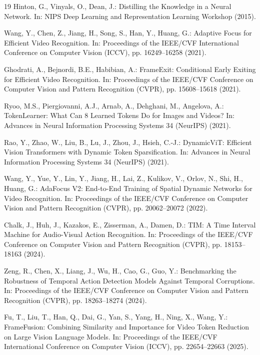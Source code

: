\documentclass[runningheads]{llncs}
\begin{document}
\begin{thebibliography}{19}
Hinton, G., Vinyals, O., Dean, J.:
Distilling the Knowledge in a Neural Network.
In: NIPS Deep Learning and Representation Learning Workshop (2015).

Wang, Y., Chen, Z., Jiang, H., Song, S., Han, Y., Huang, G.:
Adaptive Focus for Efficient Video Recognition.
In: Proceedings of the IEEE/CVF International Conference on Computer Vision (ICCV), pp. 16249--16258 (2021).

Ghodrati, A., Bejnordi, B.E., Habibian, A.:
FrameExit: Conditional Early Exiting for Efficient Video Recognition.
In: Proceedings of the IEEE/CVF Conference on Computer Vision and Pattern Recognition (CVPR), pp. 15608--15618 (2021).

Ryoo, M.S., Piergiovanni, A.J., Arnab, A., Dehghani, M., Angelova, A.:
TokenLearner: What Can 8 Learned Tokens Do for Images and Videos?
In: Advances in Neural Information Processing Systems 34 (NeurIPS) (2021).

Rao, Y., Zhao, W., Liu, B., Lu, J., Zhou, J., Hsieh, C.-J.:
DynamicViT: Efficient Vision Transformers with Dynamic Token Sparsification.
In: Advances in Neural Information Processing Systems 34 (NeurIPS) (2021).

Wang, Y., Yue, Y., Lin, Y., Jiang, H., Lai, Z., Kulikov, V., Orlov, N., Shi, H., Huang, G.:
AdaFocus V2: End-to-End Training of Spatial Dynamic Networks for Video Recognition.
In: Proceedings of the IEEE/CVF Conference on Computer Vision and Pattern Recognition (CVPR), pp. 20062--20072 (2022).

Chalk, J., Huh, J., Kazakos, E., Zisserman, A., Damen, D.:
TIM: A Time Interval Machine for Audio-Visual Action Recognition.
In: Proceedings of the IEEE/CVF Conference on Computer Vision and Pattern Recognition (CVPR), pp. 18153--18163 (2024).

Zeng, R., Chen, X., Liang, J., Wu, H., Cao, G., Guo, Y.:
Benchmarking the Robustness of Temporal Action Detection Models Against Temporal Corruptions.
In: Proceedings of the IEEE/CVF Conference on Computer Vision and Pattern Recognition (CVPR), pp. 18263--18274 (2024).

Fu, T., Liu, T., Han, Q., Dai, G., Yan, S., Yang, H., Ning, X., Wang, Y.:
FrameFusion: Combining Similarity and Importance for Video Token Reduction on Large Vision Language Models.
In: Proceedings of the IEEE/CVF International Conference on Computer Vision (ICCV), pp. 22654--22663 (2025).


\end{thebibliography}
\end{document}
